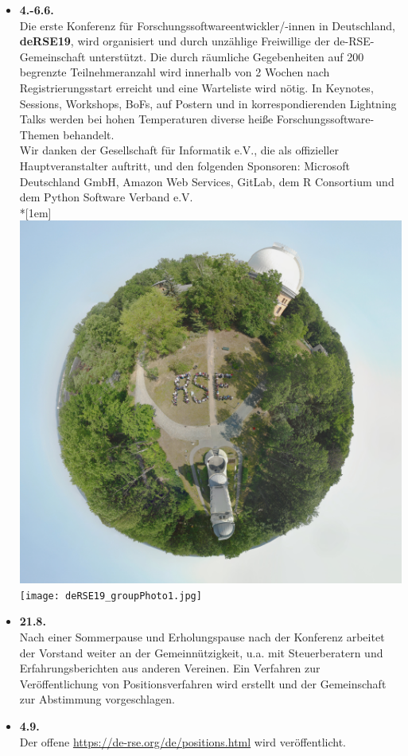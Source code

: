 \begin{itemize}
 \item \textbf{4.-6.6.}\\
 Die erste Konferenz für Forschungssoftwareentwickler/-innen in Deutschland, \textbf{deRSE19}, wird organisiert und durch unzählige Freiwillige der de-RSE-Gemeinschaft unterstützt. Die durch räumliche Gegebenheiten auf 200 begrenzte Teilnehmeranzahl wird innerhalb von 2 Wochen nach Registrierungsstart erreicht und eine Warteliste wird nötig. In Keynotes, Sessions, Workshops, BoFs, auf Postern und in korrespondierenden Lightning Talks werden bei hohen Temperaturen diverse heiße Forschungssoftware-Themen behandelt.\\
 Wir danken der Gesellschaft für Informatik e.V., die als offizieller Hauptveranstalter auftritt, und den folgenden Sponsoren: Microsoft Deutschland GmbH, Amazon Web Services, GitLab, dem R Consortium und dem Python Software Verband e.V.\\*[1em]
  \hspace*{.11\textwidth}\includegraphics[width=.71\textwidth]{deRSE19_littlePlanet.jpg}\\
  \hspace*{.11\textwidth}\texttt{[image: deRSE19\_groupPhoto1.jpg]}
 \item \textbf{21.8.}\\
 Nach einer Sommerpause und Erholungspause nach der Konferenz arbeitet der Vorstand weiter an der Gemeinnützigkeit, u.a. mit Steuerberatern und Erfahrungsberichten aus anderen Vereinen. Ein Verfahren zur Veröffentlichung von Positionsverfahren wird erstellt und der Gemeinschaft zur Abstimmung vorgeschlagen.
 \item \textbf{4.9.}\\
 Der offene \href{Communityprozess zur Findung offizieller Positionen von de-RSE e.V.}{https://de-rse.org/de/positions.html} wird veröffentlicht.

\end{itemize}
